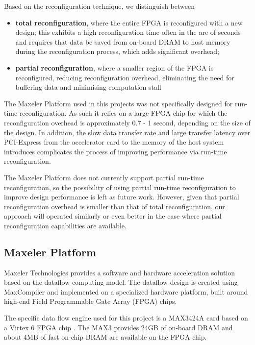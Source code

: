 Based on the reconfiguration technique, we distinguish between
\begin{itemize}
\item \textbf{total reconfiguration}, where the entire FPGA is
  reconfigured with a new design; this exhibits a high reconfiguration
  time often in the are of seconds and requires that data be saved
  from on-board DRAM to host memory during the reconfiguration
  process, which adds significant overhead;
\item \textbf{partial reconfiguration}, where a smaller region of the
  FPGA is reconfigured, reducing reconfiguration overhead, eliminating
  the need for buffering data and minimising computation stall
\end{itemize}

The Maxeler Platform used in this projects was not specifically
designed for run-time reconfiguration. As such it relies on a large
FPGA chip for which the reconfiguration overhead is approximately 0.7
- 1 second, depending on the size of the design. In addition, the slow
data transfer rate and large transfer latency over PCI-Express from
the accelerator card to the memory of the host system introduces
complicates the process of improving performance via run-time
reconfiguration.

The Maxeler Platform does not currently support partial run-time
reconfiguration, so the possibility of using partial run-time
reconfiguration to improve design performance is left as future
work. However, given that partial reconfiguration overhead is smaller
than that of total reconfiguration, our approach will operated
similarly or even better in the case where partial reconfiguration
capabilities are available.

\subsection{Maxeler Platform}
\label{sec:maxeler-platform}
Maxeler Technologies provides a software and hardware acceleration
solution based on the dataflow computing model. The dataflow design is
created using MaxCompiler \cite{Maxeler} and implemented on a specialized
hardware platform, built around high-end Field Programmable Gate Array
(FPGA) chips.


The specific data flow engine used for this project is a MAX3424A card
based on a Virtex 6 FPGA chip \cite{Virtex6}. The MAX3 provides 24GB of
on-board DRAM and about 4MB of fast on-chip BRAM are available on the
FPGA chip.

